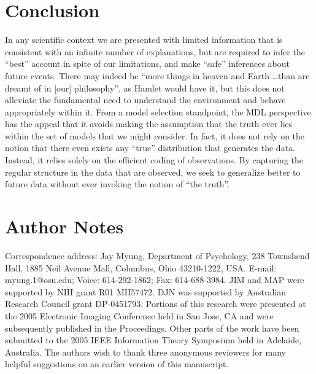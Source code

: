 \documentclass{elsart}
\begin{document}
\section{Conclusion}


In any scientific context we are presented with limited information that is consistent with an
infinite number of explanations, but are required to infer the ``best'' account in spite of our
limitations, and make ``safe'' inferences about future events. There may indeed be ``more things
in heaven and Earth \ldots than are dreamt of in [our] philosophy'', as Hamlet would have it, but
this does not alleviate the fundamental need to understand the environment and behave
appropriately within it. From a model selection standpoint, the MDL perspective has the appeal
that it avoids making the assumption that the truth ever lies within the set of models that we
might consider. In fact, it does not rely on the notion that there even exists any ``true''
distribution that generates the data. Instead, it relies solely on the efficient coding of
observations. By capturing the regular structure in the data that are observed, we seek to
generalize better to future data without ever invoking the notion of ``the truth''.




\section*{Author Notes}


Correspondence address: Jay Myung, Department of Psychology, 238 Townshend Hall, 1885 Neil Avenue
Mall, Columbus, Ohio 43210-1222, USA. E-mail: myung.1@osu.edu; Voice: 614-292-1862; Fax:
614-688-3984. JIM and MAP were supported by NIH grant R01 MH57472. DJN was supported by Australian
Research Council grant DP-0451793. Portions of this research were presented at the 2005 Electronic
Imaging Conference held in San Jose, CA and were subsequently published in the Proceedings. Other
parts of the work have been submitted to the 2005 IEEE Information Theory Symposium held in
Adelaide, Australia. The authors wish to thank three anonymous reviewers for many helpful
suggestions on an earlier version of this manuscript.




\end{document}
